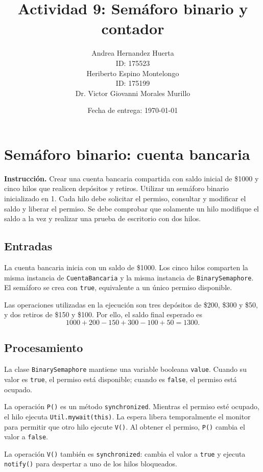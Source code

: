 \documentclass[12pt,oneside]{template/liverpoolthesis}
\title{Actividad 9: Semáforo binario y contador}
\author{%
  Andrea Hernandez Huerta\\
  ID: 175523\\[1em]
  Heriberto Espino Montelongo\\
  ID: 175199\\[1em]
  \text{Profesor:} Dr. Victor Giovanni Morales Murillo}
\date{Fecha de entrega: \today}
\begin{document}
\frontmatter
\maketitle
\tableofcontents
\listoffigures
\listoftables

\mainmatter

\chapter{Semáforo binario: cuenta bancaria}

\textbf{Instrucción.} Crear una cuenta bancaria compartida con saldo inicial de
\$1000 y cinco hilos que realicen depósitos y retiros. Utilizar un semáforo
binario inicializado en 1. Cada hilo debe solicitar el permiso, consultar y
modificar el saldo y liberar el permiso. Se debe comprobar que solamente un
hilo modifique el saldo a la vez y realizar una prueba de escritorio con dos
hilos.

\section{Entradas}

La cuenta bancaria inicia con un saldo de \$1000. Los cinco hilos comparten la
misma instancia de \texttt{CuentaBancaria} y la misma instancia de
\texttt{BinarySemaphore}. El semáforo se crea con \texttt{true}, equivalente
a un único permiso disponible.

Las operaciones utilizadas en la ejecución son tres depósitos de \$200,
\$300 y \$50, y dos retiros de \$150 y \$100. Por ello, el saldo final esperado
es
\[
1000+200-150+300-100+50=1300.
\]

\section{Procesamiento}

La clase \texttt{BinarySemaphore} mantiene una variable booleana
\texttt{value}. Cuando su valor es \texttt{true}, el permiso está disponible;
cuando es \texttt{false}, el permiso está ocupado.

La operación \texttt{P()} es un método \texttt{synchronized}. Mientras el
permiso esté ocupado, el hilo ejecuta \texttt{Util.mywait(this)}. La espera
libera temporalmente el monitor para permitir que otro hilo ejecute
\texttt{V()}. Al obtener el permiso, \texttt{P()} cambia el valor a
\texttt{false}.

La operación \texttt{V()} también es \texttt{synchronized}: cambia el valor a
\texttt{true} y ejecuta \texttt{notify()} para despertar a uno de los hilos
bloqueados.
\end{document}
